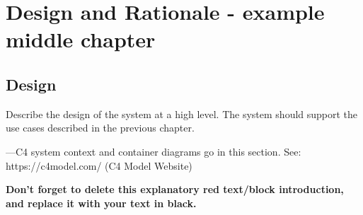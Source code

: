 \chapter{Design and Rationale - example middle chapter} %

\section{Design} %

\begin{tcolorbox}[      %
    boxrule=0pt,        %
    colback=white,      %
    coltext=red         %
]                       %
    Describe the design of the system at a high level. The system should support the use cases described in the previous chapter.
    
    ---C4 system context and container diagrams go in this section. See: https://c4model.com/ (C4 Model Website)

    \vspace{15pt}       %
    \begin{center}      %
    \textbf{Don't forget to delete this explanatory red text/block introduction, and replace it with your text in black.}
    \end{center}        %
\end{tcolorbox}         %

\pagebreak

